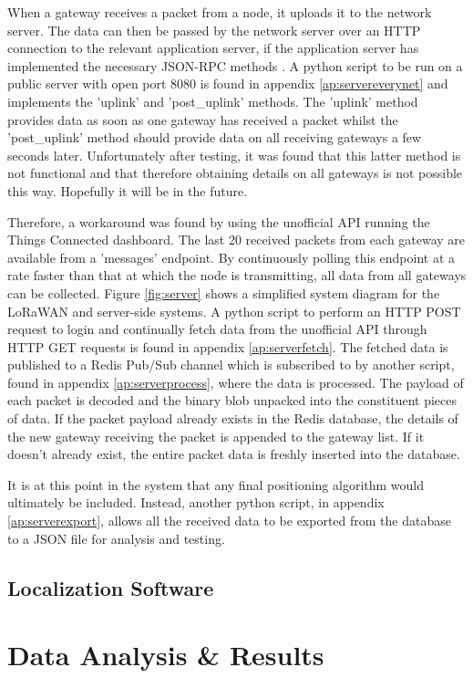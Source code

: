 \documentclass[a4paper]{report}
\begin{document}
    When a gateway receives a packet from a node, it uploads it to the network server. The data can then be passed by the network server over an HTTP connection to the relevant application server, if the application server has implemented the necessary JSON-RPC methods \cite{EverynetAPI}. A python script to be run on a public server with open port 8080 is found in appendix \ref{ap:servereverynet} and implements the 'uplink' and 'post\_uplink' methods. The 'uplink' method provides data as soon as one gateway has received a packet whilst the 'post\_uplink' method should provide data on all receiving gateways a few seconds later. Unfortunately after testing, it was found that this latter method is not functional and that therefore obtaining details on all gateways is not possible this way. Hopefully it will be in the future.

    Therefore, a workaround was found by using the unofficial API running the Things Connected dashboard. The last 20 received packets from each gateway are available from a 'messages' endpoint. By continuously polling this endpoint at a rate faster than that at which the node is transmitting, all data from all gateways can be collected. Figure \ref{fig:server} shows a simplified system diagram for the LoRaWAN and server-side systems. A python script to perform an HTTP POST request to login and continually fetch data from the unofficial API through HTTP GET requests is found in appendix \ref{ap:serverfetch}. The fetched data is published to a Redis Pub/Sub channel which is subscribed to by another script, found in appendix \ref{ap:serverprocess}, where the data is processed. The payload of each packet is decoded and the binary blob unpacked into the constituent pieces of data. If the packet payload already exists in the Redis database, the details of the new gateway receiving the packet is appended to the gateway list. If it doesn't already exist, the entire packet data is freshly inserted into the database.

    It is at this point in the system that any final positioning algorithm would ultimately be included. Instead, another python script, in appendix \ref{ap:serverexport}, allows all the received data to be exported from the database to a JSON file for analysis and testing.

  \section{Localization Software}

\chapter{Data Analysis \& Results}
\end{document}
